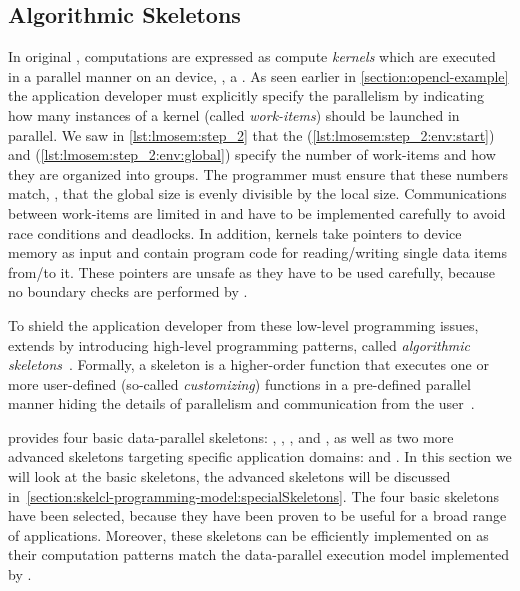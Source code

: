 \subsection{Algorithmic Skeletons}
\label{section:skelcl-programming-model:skeletons}
In original \OpenCL, computations are expressed as compute \emph{kernels} which are executed in a parallel manner on an \OpenCL device, \eg, a \GPU.
As seen earlier in \autoref{section:opencl-example} the application developer must explicitly specify the parallelism by indicating how many instances of a kernel (called \emph{work-items}) should be launched in parallel.
We saw in \autoref{lst:lmosem:step_2} that the  (\autoref{lst:lmosem:step_2:env:start}) and  (\autoref{lst:lmosem:step_2:env:global}) specify the number of work-items and how they are organized into groups.
The programmer must ensure that these numbers match, \ie, that the global size is evenly divisible by the local size.
Communications between work-items are limited in \OpenCL and have to be implemented carefully to avoid race conditions and deadlocks.
In addition, kernels take pointers to device memory as input and contain program code for reading/writing single data items from/to it.
These pointers are unsafe as they have to be used carefully, because no boundary checks are performed by \OpenCL.

To shield the application developer from these low-level programming issues, \SkelCL extends \OpenCL by introducing high-level programming patterns, called \emph{algorithmic skeletons}~\cite{Cole1991}.
Formally, a skeleton is a higher-order function that executes one or more user-defined (so-called \emph{customizing}) functions in a pre-defined parallel manner hiding the details of parallelism and communication from the user~\cite{GorlatchCo2011}.

\SkelCL provides four basic data-parallel skeletons: \map, \zip, \reduce, and \scan,
as well as two more advanced skeletons targeting specific application domains: \stencil and \allpairs.
In this section we will look at the basic skeletons, the advanced skeletons will be discussed in~\autoref{section:skelcl-programming-model:specialSkeletons}.
The four basic skeletons have been selected, because they have been proven to be useful for a broad range of applications.
Moreover, these skeletons can be efficiently implemented on \GPUs as their computation patterns match the data-parallel execution model implemented by \GPUs.

